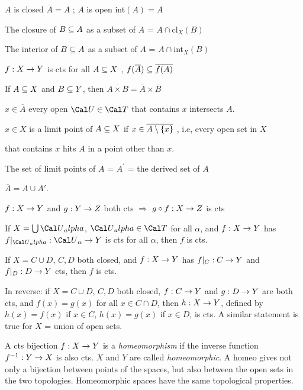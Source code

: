 \hsk $A$ is closed \lra $\overline{A} = A$ \hsk ; \hsk $A$ is open \lra int$(A) = A$

\hsk The closure of $B\subseteq A$ as a subset of $A$ = $A\cap$cl$_X(B)$

\hsk The interior of $B\subseteq A$ as a subset of $A$ = $A\cap$int$_X(B)$

\hsk $f: X\rightarrow Y$ is cts \lra for all $A\subseteq X$ , $f(\overline{A})\subseteq\overline{f(A)}$

\hsk If $A\subseteq X$ and $B\subseteq Y$, then $\overline{A\times B} = \overline{A}\times\overline{B}$

\hsk $x \in \overline{A}$ \lra every open $\cau\in\cat$ that contains $x$ intersects $A$.

\ssk

$x\in X$ is a limit point of $A\subseteq X$ if $x\in\overline{A\setminus\{x\}}$ , i.e, every open set in $X$ 

that contains $x$ hits $A$ in a point other than $x$. 

The set of limit points of $A$ = $A^\prime$ = the derived set of $A$ 

\hsk $\overline{A}=A \cup A'$.


$f:X\rightarrow Y$ and $g: Y\rightarrow Z$ both cts $\Rightarrow$ $g\circ f : X\rightarrow Z$ is cts

If $X=\bigcup \cau_alpha$, $\cau_alpha\in\cat$ for all $\alpha$, and $f: X\rightarrow Y$ has $f|_{\cau_alpha}: \cau_\alpha\ra Y$ is cts
for all $\alpha$, then $f$ is cts.

If $X=C\cup D$, $C,D$ both closed, and $f: X\rightarrow Y$ has $f|_C: C\rightarrow Y$ and $f|_D: D\rightarrow Y$ cts, then $f$ is cts.

In reverse: if $X=C\cup D$, $C,D$ both closed, $f: C\rightarrow Y$ and $g: D\rightarrow Y$ are both cts, and
$f(x)=g(x)$ for all $x\in C\cap D$, then $h: X\rightarrow Y$, defined by $h(x)=f(x)$ if 
$x\in C$, $h(x)=g(x)$ if $x\in D$, is cts. A similar statement is true for $X$ = union of open sets.

\ssk

A cts bijection $f:X\rightarrow Y$ is a {\it homeomorphism} if the inverse function $f^{-1} : Y\rightarrow X$ is also 
cts. $X$ and $Y$ are called {\it homeomorphic}. A homeo gives not only a bijection between points
of the spaces, but also between the open sets in the two topologies. Homeomorphic spaces have the 
same topological properties.

\msk


